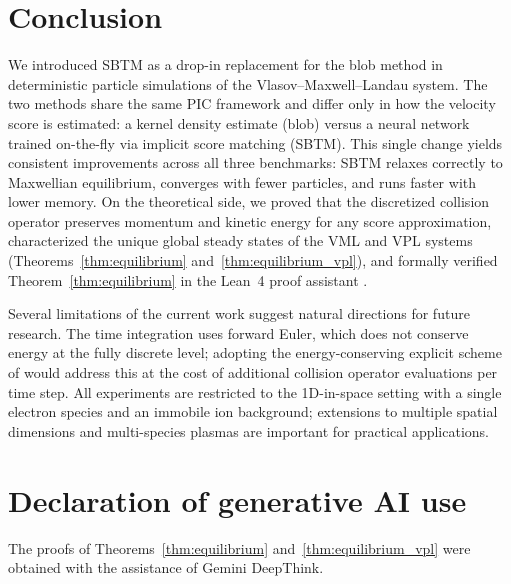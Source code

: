 \documentclass[]{article}
\numberwithin{equation}{section}
\begin{document}
\section{Conclusion}
\label{sec:conclusion}

We introduced SBTM as a drop-in replacement for the blob method in deterministic particle simulations of the Vlasov--Maxwell--Landau system.  The two methods share the same PIC framework and differ only in how the velocity score is estimated: a kernel density estimate (blob) versus a neural network trained on-the-fly via implicit score matching (SBTM).  This single change yields consistent improvements across all three benchmarks: SBTM relaxes correctly to Maxwellian equilibrium, converges with fewer particles, and runs faster with lower memory.  On the theoretical side, we proved that the discretized collision operator preserves momentum and kinetic energy for any score approximation, characterized the unique global steady states of the VML and VPL systems (Theorems~\ref{thm:equilibrium} and~\ref{thm:equilibrium_vpl}), and formally verified Theorem~\ref{thm:equilibrium} in the Lean~4 proof assistant \citep{ilin2026formalization}.

Several limitations of the current work suggest natural directions for future research.  The time integration uses forward Euler, which does not conserve energy at the fully discrete level; adopting the energy-conserving explicit scheme of \citep{yoo2025explicit} would address this at the cost of additional collision operator evaluations per time step.  All experiments are restricted to the 1D-in-space setting with a single electron species and an immobile ion background; extensions to multiple spatial dimensions and multi-species plasmas are important for practical applications.  %



\section*{Declaration of generative AI use}
The proofs of Theorems~\ref{thm:equilibrium} and~\ref{thm:equilibrium_vpl} were obtained with the assistance of Gemini DeepThink.  
\end{document}
